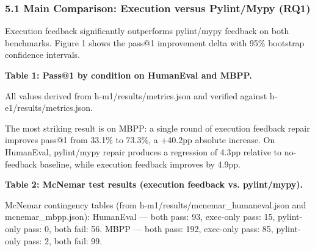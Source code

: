 
\subsubsection{5.1 Main Comparison: Execution versus Pylint/Mypy (RQ1)}

Execution feedback significantly outperforms pylint/mypy feedback on both benchmarks. Figure 1 shows the pass@1 improvement delta with 95\% bootstrap confidence intervals.

\textbf{Table 1: Pass@1 by condition on HumanEval and MBPP.}

\begin{table}[htbp]
\centering
{}
\end{table}

All values derived from h-m1/results/metrics.json and verified against h-e1/results/metrics.json.

The most striking result is on MBPP: a single round of execution feedback repair improves pass@1 from 33.1\% to 73.3\%, a +40.2pp absolute increase. On HumanEval, pylint/mypy repair produces a regression of 4.3pp relative to no-feedback baseline, while execution feedback improves by 4.9pp.

\textbf{Table 2: McNemar test results (execution feedback vs. pylint/mypy).}

\begin{table}[htbp]
\centering
{}
\end{table}

McNemar contingency tables (from h-m1/results/mcnemar\_humaneval.json and mcnemar\_mbpp.json): HumanEval --- both pass: 93, exec-only pass: 15, pylint-only pass: 0, both fail: 56. MBPP --- both pass: 192, exec-only pass: 85, pylint-only pass: 2, both fail: 99.

